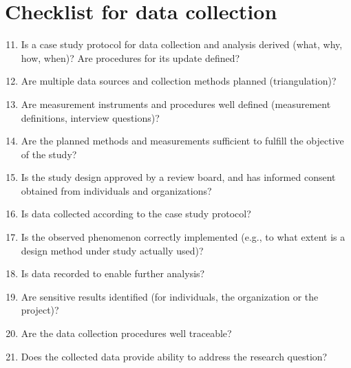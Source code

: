 \section{Checklist for data collection}
\begin{tcolorbox}[colback=black!5!white,colframe=black!75!white,title=Checklist for Preparation for data collection \cite{runeson2009guidelines}]
\begin{enumerate}
    \setcounter{enumi}{10}
    \item Is a case study protocol for data collection and analysis derived (what, why,
    how, when)? Are procedures for its update defined?
    \item Are multiple data sources and collection methods planned (triangulation)?
    \item Are measurement instruments and procedures well defined (measurement definitions, interview questions)?
    \item Are the planned methods and measurements sufficient to fulfill the objective of the study?
    \item Is the study design approved by a review board, and has informed consent obtained from individuals and organizations?
    \item Is data collected according to the case study protocol?
    \item Is the observed phenomenon correctly implemented (e.g., to what extent is a design method under study actually used)?
    \item Is data recorded to enable further analysis?
    \item Are sensitive results identified (for individuals, the organization or the project)?
    \item Are the data collection procedures well traceable?
    \item Does the collected data provide ability to address the research question?
\end{enumerate}
\end{tcolorbox}

